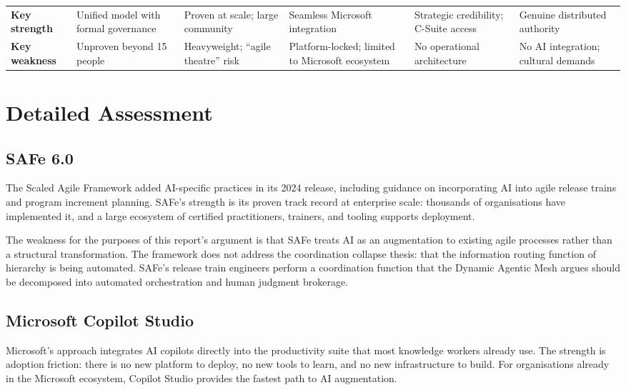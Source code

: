 \begin{table}[h]
\begin{tabularx}{\textwidth}{l X X X X X}
\addlinespace
\textbf{Key strength} & Unified model with formal governance & Proven at scale; large community & Seamless Microsoft integration & Strategic credibility; C-Suite access & Genuine distributed authority \\
\addlinespace
\textbf{Key weakness} & Unproven beyond 15 people & Heavyweight; ``agile theatre'' risk & Platform-locked; limited to Microsoft ecosystem & No operational architecture & No AI integration; cultural demands \\
\bottomrule
\end{tabularx}
\end{table}

\section{Detailed Assessment}

\subsection{SAFe 6.0}

The Scaled Agile Framework added AI-specific practices in its 2024 release, including guidance on incorporating AI into agile release trains and program increment planning. SAFe's strength is its proven track record at enterprise scale: thousands of organisations have implemented it, and a large ecosystem of certified practitioners, trainers, and tooling supports deployment.

The weakness for the purposes of this report's argument is that SAFe treats AI as an augmentation to existing agile processes rather than a structural transformation. The framework does not address the coordination collapse thesis: that the information routing function of hierarchy is being automated. SAFe's release train engineers perform a coordination function that the Dynamic Agentic Mesh argues should be decomposed into automated orchestration and human judgment brokerage.

\subsection{Microsoft Copilot Studio}

Microsoft's approach integrates AI copilots directly into the productivity suite that most knowledge workers already use. The strength is adoption friction: there is no new platform to deploy, no new tools to learn, and no new infrastructure to build. For organisations already in the Microsoft ecosystem, Copilot Studio provides the fastest path to AI augmentation.

